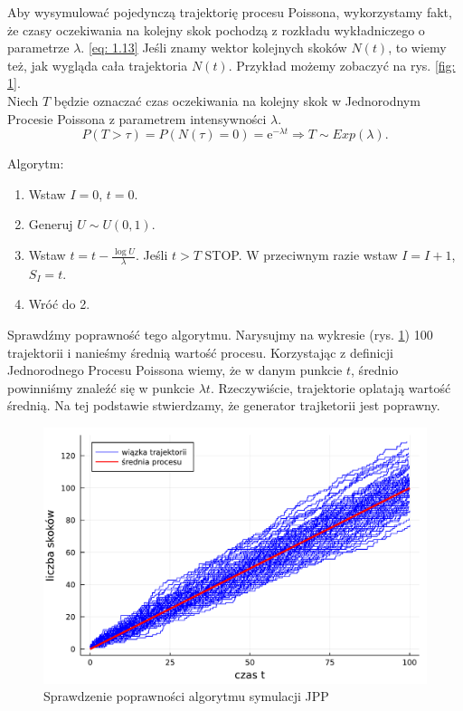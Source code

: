 \documentclass{article}
\theoremstyle{break}
\newcommand*{\e}{\mathrm{e}}
\numberwithin{equation}{subsection}
\numberwithin{figure}{section}
\begin{document}
Aby wysymulować pojedynczą trajektorię procesu Poissona, wykorzystamy fakt, że czasy oczekiwania na kolejny skok pochodzą z rozkładu wykładniczego o parametrze $\lambda$. \eqref{eq: 1.13}
Jeśli znamy wektor kolejnych skoków $N(t)$, to wiemy też, jak wygląda cała trajektoria $N(t)$. Przykład możemy zobaczyć na rys. \ref{fig: 1}.\\

Niech $T$ będzie oznaczać czas oczekiwania na kolejny skok w Jednorodnym Procesie Poissona z parametrem intensywności $\lambda$.
\begin{equation}
P(T>\tau) = P(N(\tau)=0) = \e^{-\lambda t} \Rightarrow T \sim Exp(\lambda) \label{eq: 1.13}.
\end{equation}

Algorytm:

\begin{enumerate}
\item Wstaw $I=0$, $t =0$.
\item Generuj $U\sim U(0,1)$.
\item Wstaw $t = t - \frac{\log{U}}{\lambda}$. Jeśli $t>T$ STOP. W przeciwnym razie wstaw $I = I+1$, $S_I=t$.
\item Wróć do 2.
\end{enumerate} 

Sprawdźmy poprawność tego algorytmu. Narysujmy na wykresie (rys. \ref{fig: 2}) 100 trajektorii i nanieśmy średnią wartość procesu. Korzystając z definicji Jednorodnego Procesu Poissona wiemy, że w danym punkcie $t$, średnio powinniśmy znaleźć się w punkcie $\lambda t$.
Rzeczywiście, trajektorie oplatają wartość średnią. Na tej podstawie stwierdzamy, że generator trajketorii jest poprawny.

\begin{figure}[H]
	\center
	\includegraphics[scale=0.35]{poprawność_poissona.pdf}
	\caption{Sprawdzenie poprawności algorytmu symulacji JPP}
	\label{fig: 2}
\end{figure}
\end{document}
